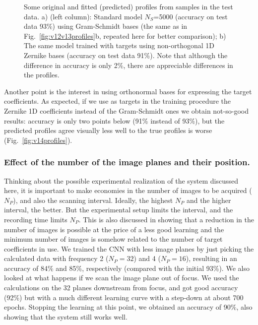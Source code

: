 \documentclass{iucr}
\begin{document}
\begin{figure}
    \caption{Some original and fitted (predicted) profiles from samples in the test data. a) (left column): Standard model $N_S$=5000 (accuracy on test  data 93\%) using Gram-Schmidt bases (the same as in Fig.~\ref{fig:v12v13profiles}b, repeated here for better comparison); b) The same model trained with targets using  non-orthogonal 1D Zernike bases (accuracy on test  data 91\%). Note that although the difference in accuracy is only 2\%, there are appreciable differences in the profiles.
    }
\end{figure}

Another point is the interest in using orthonormal bases for expressing the target coefficients. As expected, if we use as targets in the training procedure the Zernike 1D coefficients instead of the Gram-Schmidt ones we obtain not-so-good results: 
accuracy is only two points below (91\% instead of 93\%), but the predicted profiles agree visually less well to the true profiles is worse (Fig.~\ref{fig:v14profiles}).


\subsubsection{Effect of the number of the image planes and their position.}

Thinking about the possible experimental realization of the system discussed here, it is important to make economies in the number of images to be acquired ($N_P$), and also the scanning interval. Ideally, the highest $N_P$ and the higher interval, the better. But the experimental setup limits the interval, and the recording time limits $N_P$. This is also discussed in \cite{Saha2020} showing that a reduction in the number of images is possible at the price of a less good learning and the minimum number of images is somehow related to the number of target coefficients in use. We trained the CNN with less image planes by just picking the calculated data with frequency 2 ($N_P=32$) and 4 ($N_P=16$), resulting in an accuracy of 84\% and 85\%, respectively (compared with the initial 93\%). 
We also looked at what happens if we scan the image plane out of focus. We used the calculations on the 32 planes downstream from focus, and got good accuracy (92\%) but with a much different learning curve with a step-down at about 700 epochs. Stopping the learning at this point, we obtained an accuracy of 90\%, also showing that the system still works well. 
\end{document}
